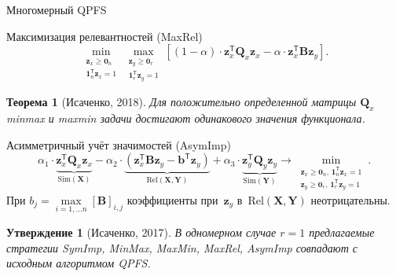 \documentclass[9pt]{beamer}
\newcommand{\bz}{\mathbf{z}}
\newcommand{\bb}{\mathbf{b}}
\newcommand{\bY}{\mathbf{Y}}
\newcommand{\bX}{\mathbf{X}}
\newcommand{\bB}{\mathbf{B}}
\newcommand{\bQ}{\mathbf{Q}}
\newcommand{\bOne}{\boldsymbol{1}}
\newcommand{\bZero}{\boldsymbol{0}}
\newcommand{\T}{\mathsf{T}}
\newtheorem{statement}{Утверждение}
\newtheorem{rustheorem}{Теорема}
\begin{document}
\begin{frame}{Многомерный QPFS}
	\begin{block}{Максимизация релевантностей (MaxRel)}
	\[
		\min_{\substack{\bz_x \geq \bZero_n \\ \bOne_n^{\T}\bz_x=1}} 	\max_{\substack{\bz_y \geq \bZero_r \\ \bOne_r^{\T}\bz_y=1}} \left[ (1 - \alpha) \cdot \bz_x^{\T} \bQ_x \bz_x - \alpha \cdot \bz_x^{\T} \bB \bz_y \right].
	\]
	\end{block}
	\begin{rustheorem}[Исаченко, 2018]
		Для положительно определенной матрицы $\bQ_x$ minmax и maxmin задачи достигают одинакового значения функционала.
	\end{rustheorem}
	\begin{block}{Асимметричный учёт значимостей (AsymImp)}
	\begin{equation*}
	\alpha_1 \cdot \underbrace{\bz_x^{\T} \bQ_x \bz_x}_{\text{Sim}(\bX)} - \alpha_2 \cdot  \underbrace{\left(\bz_x^{\T} \bB \bz_y - \bb^{\T} \bz_y \right) }_{\text{Rel}(\bX, \bY)} + \alpha_3 \cdot \underbrace{\bz_y^{\T} \bQ_y \bz_y}_{\text{Sim}(\bY)} \rightarrow \min_{\substack{\bz_x \geq \bZero_n, \, \bOne_n^{\T}\bz_x=1 \\ \bz_y \geq \bZero_r, \, \bOne_r^{\T}\bz_y=1}}.
	\end{equation*}
	При $b_j = \max\limits_{i=1, \dots n} [\bB]_{i, j}$ коэффициенты при~$\bz_y$ в~$\text{Rel}(\bX, \bY)$ неотрицательны.
	
	\begin{statement}[Исаченко, 2017]
		В одномерном случае $r=1$ предлагаемые стратегии SymImp, MinMax, MaxMin, MaxRel, AsymImp совпадают с исходным алгоритмом QPFS.
	\end{statement}
\end{block}
\end{frame}
\end{document}
